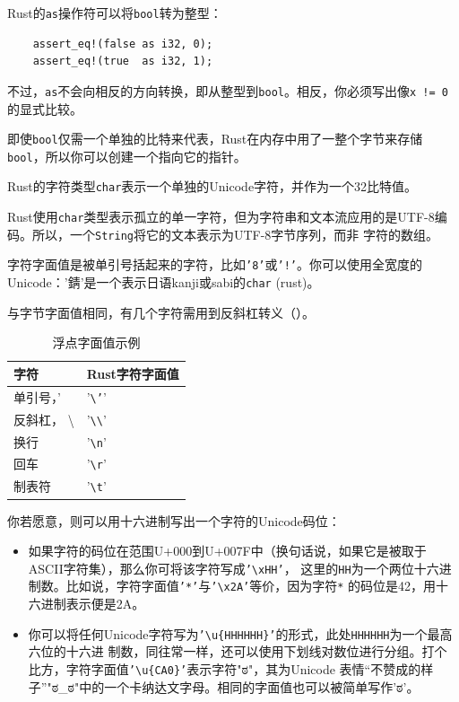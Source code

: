 \medskip
Rust的\texttt{as}操作符可以将\texttt{bool}转为整型：
\begin{verbatim}
    assert_eq!(false as i32, 0);
    assert_eq!(true  as i32, 1);
\end{verbatim}

\smallskip
不过，\texttt{as}不会向相反的方向转换，即从整型到\texttt{bool}。相反，你必须写出像\texttt{x != 0}的显式比较。

\medskip
即使\texttt{bool}仅需一个单独的比特来代表，Rust在内存中用了一整个字节来存储\texttt{bool}，所以你可以创建一个指向它的指针。

\bigskip
{}\label{SEC-CHAR}
Rust的字符类型\texttt{char}表示一个单独的Unicode字符，并作为一个32比特值。

\medskip
Rust使用\texttt{char}类型表示孤立的单一字符，但为字符串和文本流应用的是UTF-8编码。所以，一个\texttt{String}将它的文本表示为UTF-8字节序列，而非
字符的数组。

\medskip
字符字面值是被单引号括起来的字符，比如\texttt{'8'}或\texttt{'!'}。你可以使用全宽度的Unicode：'錆'是一个表示日语kanji或sabi的\texttt{char}
(rust)。

\medskip
与字节字面值相同，有几个字符需用到反斜杠转义（）。

\smallskip
\begin{table}[h]
    \small
    \caption{浮点字面值示例}\label{TABLE3-10}
    \begin{tabularx}{\linewidth}{X X}
        \toprule
        \textbf{字符} & \textbf{Rust字符字面值} \\
        \midrule
        单引号，' & '\texttt{\textbackslash'}' \\
        反斜杠， \textbackslash & '\texttt{\textbackslash\textbackslash}' \\
        换行 & '\texttt{\textbackslash{n}}' \\
        回车 & '\texttt{\textbackslash{r}}' \\
        制表符 & '\texttt{\textbackslash{t}}' \\
        \bottomrule
    \end{tabularx}
\end{table}

\smallskip
你若愿意，则可以用十六进制写出一个字符的Unicode码位：
\begin{itemize}
    \item 如果字符的码位在范围U+000到U+007F中（换句话说，如果它是被取于ASCII字符集），那么你可将该字符写成\texttt{'\textbackslash{xHH}'}，
          这里的\texttt{HH}为一个两位十六进制数。比如说，字符字面值\texttt{'*'}与\texttt{'\textbackslash{x2A}'}等价，因为字符\texttt{*}
          的码位是42，用十六进制表示便是2A。
    \item 你可以将任何Unicode字符写为\texttt{'\textbackslash{u\{HHHHHH\}}'}的形式，此处\texttt{\texttt{HHHHHH}}为一个最高六位的十六进
          制数，同往常一样，还可以使用下划线对数位进行分组。打个比方，字符字面值\texttt{'\textbackslash{u\{CA0\}}'}表示字符"ಠ"，其为Unicode
          表情“不赞成的样子”"ಠ\_ಠ"中的一个卡纳达文字母。相同的字面值也可以被简单写作'ಠ'。
\end{itemize}

